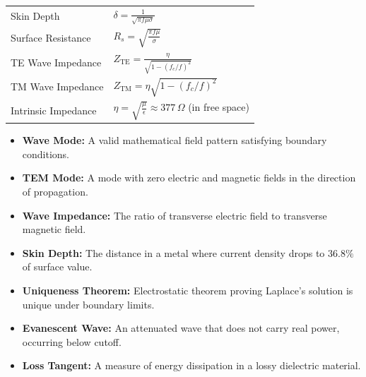 \documentclass[12pt,a4paper]{article}
\renewcommand{\arraystretch}{1.45}
\begin{document}
\begin{tcolorbox}[formulabox, title={\textbf{Key Formulas at a Glance}}]
\renewcommand{\arraystretch}{1.3}
\begin{tabularx}{\linewidth}{B{4.5cm} X}Skin Depth              & $\delta = \frac{1}{\sqrt{\pi f \mu \sigma}}$ \\[4pt]
Surface Resistance      & $R_s = \sqrt{\frac{\pi f \mu}{\sigma}}$ \\[4pt]
TE Wave Impedance       & $Z_{\text{TE}} = \frac{\eta}{\sqrt{1 - (f_c/f)^2}}$ \\[4pt]
TM Wave Impedance       & $Z_{\text{TM}} = \eta \sqrt{1 - (f_c/f)^2}$ \\[4pt]
Intrinsic Impedance     & $\eta = \sqrt{\frac{\mu}{\epsilon}} \approx 377\,\Omega$ (in free space)
\end{tabularx}
\end{tcolorbox}

\begin{tcolorbox}[defbox, title={\textbf{One-Line Definitions}}]
\begin{itemize}[leftmargin=*, itemsep=2.5pt, topsep=0pt]
  \item \textbf{Wave Mode:} A valid mathematical field pattern satisfying boundary conditions.
  \item \textbf{TEM Mode:} A mode with zero electric and magnetic fields in the direction of propagation.
  \item \textbf{Wave Impedance:} The ratio of transverse electric field to transverse magnetic field.
  \item \textbf{Skin Depth:} The distance in a metal where current density drops to $36.8\%$ of surface value.
  \item \textbf{Uniqueness Theorem:} Electrostatic theorem proving Laplace's solution is unique under boundary limits.
  \item \textbf{Evanescent Wave:} An attenuated wave that does not carry real power, occurring below cutoff.
  \item \textbf{Loss Tangent:} A measure of energy dissipation in a lossy dielectric material.
\end{itemize}
\end{tcolorbox}
\end{document}
